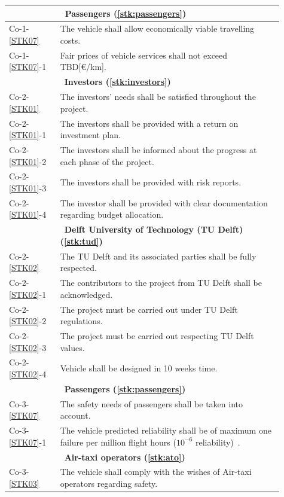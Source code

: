 \begin{longtable}{m{0.17\linewidth}m{0.74\linewidth}}
        \hline &~\textbf{Passengers (\ref{stk:passengers})} \\\hline
        Co-1-\ref{STK07} & The vehicle shall allow economically viable travelling costs. \\
        Co-1-\ref{STK07}-1 & Fair prices of vehicle services shall not exceed TBD[€/km]. \\
       \hline  &~\textbf{Investors (\ref{stk:investors})} \\\hline
        Co-2-\ref{STK01} & The investors' needs shall be satisfied throughout the project.\\
            Co-2-\ref{STK01}-1 & The investors shall be provided with a return on investment plan.\\
            Co-2-\ref{STK01}-2 & The investors shall be informed about the progress at each phase of the project.\\
            Co-2-\ref{STK01}-3 & The investors shall be provided with risk reports.\\
            Co-2-\ref{STK01}-4 & The investor shall be provided with clear documentation regarding budget allocation. \\
        \hline &~\textbf{Delft University of Technology (TU Delft) (\ref{stk:tud})} \\ \hline
        Co-2-\ref{STK02} & The TU Delft and its associated parties shall be fully respected.\\
            Co-2-\ref{STK02}-1 & The contributors to the project from TU Delft shall be acknowledged.\\
            Co-2-\ref{STK02}-2 & The project must be carried out under TU Delft regulations.\\
            Co-2-\ref{STK02}-3 & The project must be carried out respecting TU Delft values.\\
            Co-2-\ref{STK02}-4 & Vehicle shall be designed in 10 weeks time.\\
        \hline &~\textbf{Passengers (\ref{stk:passengers})} \\\hline
        Co-3-\ref{STK07} & The safety needs of passengers shall be taken into account. \\
        \cellcolor[HTML]{9AFF99}Co-3-\ref{STK07}-1 & \cellcolor[HTML]{9AFF99}The vehicle predicted reliability shall be of maximum one failure per million flight hours ($\text{10}^{-6}$ reliability)~\cite{106safety}. \\

        \hline &~\textbf{Air-taxi operators (\ref{stk:ato})} \\\hline
         Co-3-\ref{STK03} & The vehicle shall comply with the wishes of Air-taxi operators regarding safety. \\
      

\end{longtable}
